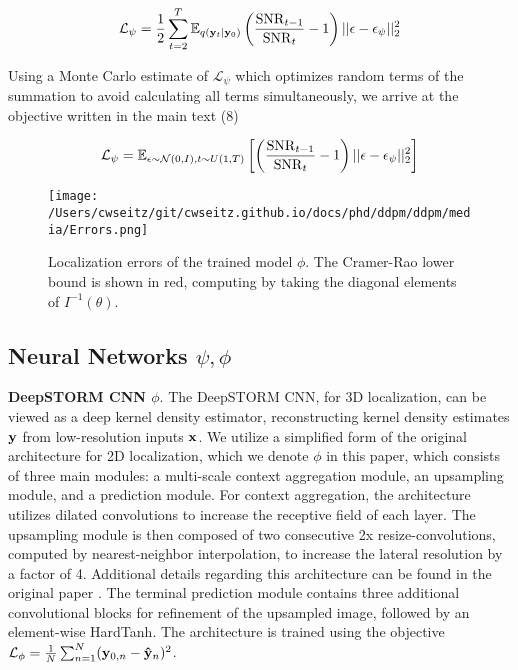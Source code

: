 \begin{equation*}
\mathcal{L}_{\psi} = \frac{1}{2}\sum_{t=2}^{T} \mathbb{E}_{q(\bold{y}_{t}\lvert\bold{y}_{0})}\left(\frac{\mathrm{SNR}_{t-1}}{{\mathrm{SNR}_{t}}}-1\right)\lvert\lvert \bold{\epsilon}-\bold{\epsilon}_{\psi}\lvert\lvert_{2}^{2}
\end{equation*}

Using a Monte Carlo estimate of $\mathcal{L}_{\psi}$ \parencite{Kingma2023} which optimizes random terms of the summation to avoid calculating all terms simultaneously, we arrive at the objective written in the main text (8)

\begin{equation*}
\mathcal{L}_{\psi} = \mathbb{E}_{\epsilon\sim \mathcal{N}(0,I),t\sim U(1,T)}\left[\left(\frac{\mathrm{SNR}_{t-1}}{{\mathrm{SNR}_{t}}}-1\right)\lvert\lvert \bold{\epsilon}-\bold{\epsilon}_{\psi}\lvert\lvert_{2}^{2}\right]
\end{equation*}


\begin{figure}[t]
\centering
\texttt{[image: /Users/cwseitz/git/cwseitz.github.io/docs/phd/ddpm/ddpm/media/Errors.png]}
\caption{Localization errors of the trained model $\phi$. The Cramer-Rao lower bound is shown in red, computing by taking the diagonal elements of $I^{-1}(\theta)$.}
\end{figure}


\subsection{Neural Networks $\psi,\phi$}

\textbf{DeepSTORM CNN $\phi$}. The DeepSTORM CNN, for 3D localization, can be viewed as a deep kernel density estimator, reconstructing kernel density estimates $\bold{y}$ from low-resolution inputs $\bold{x}$. We utilize a simplified form of the original architecture \parencite{Nehme2020} for 2D localization, which we denote $\phi$ in this paper, which consists of three main modules: a multi-scale context aggregation module, an upsampling module, and a prediction module. For context aggregation, the architecture utilizes dilated convolutions to increase the receptive field of each layer. The upsampling module is then composed of two consecutive 2x resize-convolutions, computed by nearest-neighbor interpolation, to increase the lateral resolution by a factor of 4. Additional details regarding this architecture can be found in the original paper \cite{Nehme2020}. The terminal prediction module contains three additional convolutional blocks for refinement of the upsampled image, followed by an element-wise HardTanh. The architecture is trained using the objective $\mathcal{L}_{\phi} = \frac{1}{N}\sum_{n=1}^{N} (\bold{y}_{0,n}-\bold{\hat{y}}_{n})^{2}$. 

